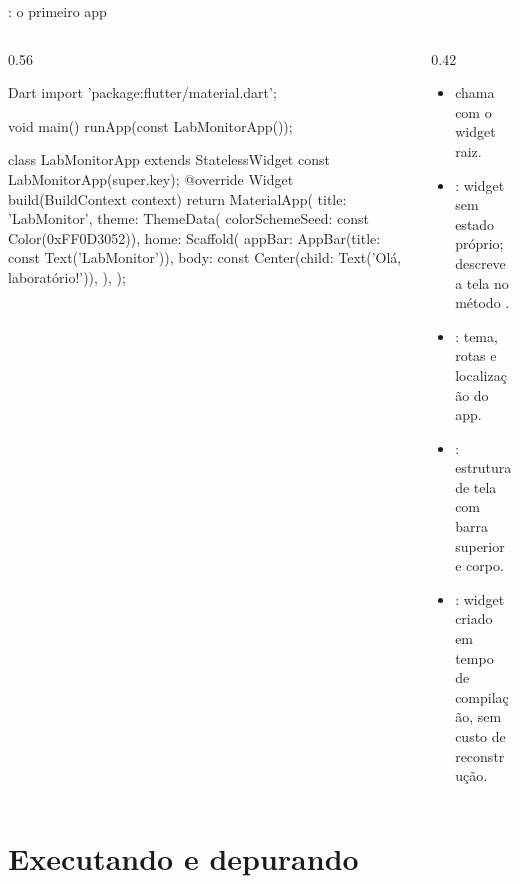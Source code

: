 \documentclass[aspectratio=169,10pt]{beamer}
\begin{document}
\begin{frame}[fragile]{: o primeiro app}
  \begin{columns}[T]
    \begin{column}{0.56\textwidth}
\begin{codigo}[title=lib/main.dart]{Dart}
import 'package:flutter/material.dart';

void main() {
  runApp(const LabMonitorApp());
}

class LabMonitorApp extends StatelessWidget {
  const LabMonitorApp({super.key});
  @override
  Widget build(BuildContext context) {
    return MaterialApp(
      title: 'LabMonitor',
      theme: ThemeData(
        colorSchemeSeed: const Color(0xFF0D3052)),
      home: Scaffold(
        appBar: AppBar(title: const Text('LabMonitor')),
        body: const Center(child: Text('Olá, laboratório!')),
      ),
    );
  }
}
\end{codigo}
    \end{column}
    \begin{column}{0.42\textwidth}
      \begin{itemize}
        \item {} chama  com o widget raiz.
        \item {}: widget sem estado próprio; descreve a tela no método .
        \item {}: tema, rotas e localização do app.
        \item {}: estrutura de tela com barra superior e corpo.
        \item {}: widget criado em tempo de compilação, sem custo de reconstrução.
      \end{itemize}
    \end{column}
  \end{columns}
\end{frame}

\section{Executando e depurando}
\end{document}
